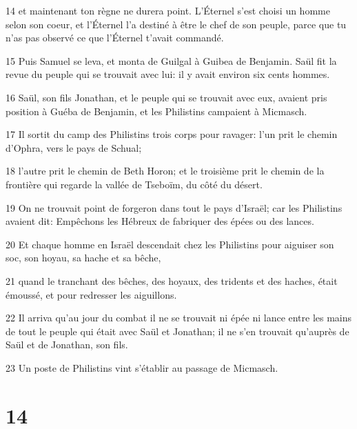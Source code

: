 \par 14 et maintenant ton règne ne durera point. L'Éternel s'est choisi un homme selon son coeur, et l'Éternel l'a destiné à être le chef de son peuple, parce que tu n'as pas observé ce que l'Éternel t'avait commandé.
\par 15 Puis Samuel se leva, et monta de Guilgal à Guibea de Benjamin. Saül fit la revue du peuple qui se trouvait avec lui: il y avait environ six cents hommes.
\par 16 Saül, son fils Jonathan, et le peuple qui se trouvait avec eux, avaient pris position à Guéba de Benjamin, et les Philistins campaient à Micmasch.
\par 17 Il sortit du camp des Philistins trois corps pour ravager: l'un prit le chemin d'Ophra, vers le pays de Schual;
\par 18 l'autre prit le chemin de Beth Horon; et le troisième prit le chemin de la frontière qui regarde la vallée de Tseboïm, du côté du désert.
\par 19 On ne trouvait point de forgeron dans tout le pays d'Israël; car les Philistins avaient dit: Empêchons les Hébreux de fabriquer des épées ou des lances.
\par 20 Et chaque homme en Israël descendait chez les Philistins pour aiguiser son soc, son hoyau, sa hache et sa bêche,
\par 21 quand le tranchant des bêches, des hoyaux, des tridents et des haches, était émoussé, et pour redresser les aiguillons.
\par 22 Il arriva qu'au jour du combat il ne se trouvait ni épée ni lance entre les mains de tout le peuple qui était avec Saül et Jonathan; il ne s'en trouvait qu'auprès de Saül et de Jonathan, son fils.
\par 23 Un poste de Philistins vint s'établir au passage de Micmasch.

\chapter{14}

